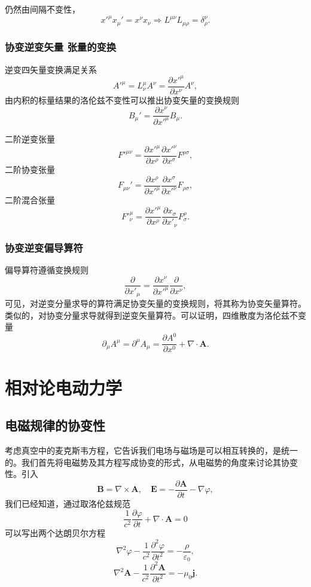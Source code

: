 \documentclass[UTF8]{ctexbook}
\renewcommand{\b}{\boldsymbol}
\numberwithin{equation}{chapter}
\begin{document}
	仍然由间隔不变性，
	\[x'^\mu x_\mu'=x^\nu x_\nu \Rightarrow L^{\mu\nu}L_{\mu \rho}=\delta_\rho^\nu.\]
	
	\subsection{协变\quad 逆变矢量 \quad 张量的变换}
	逆变四矢量变换满足关系
	\[A'^\mu=L_\nu^\mu A^\nu=\frac{\partial x'^\mu}{\partial x^\nu}A^\nu,\]
	由内积的标量结果的洛伦兹不变性可以推出协变矢量的变换规则
	\[B_\mu'=\frac{\partial x^\nu}{\partial x'^\mu}B_\mu.\]
	
	二阶逆变张量
	\[F'^{\mu\nu}=\frac{\partial x'^\mu}{\partial x^\rho}\frac{\partial x'^\nu}{\partial x^\sigma}F^{\rho\sigma},\]
	二阶协变张量
	\[F_{\mu\nu}'=\frac{\partial x^\rho}{\partial x'^\mu}\frac{\partial x^\sigma}{\partial x'^\nu}F_{\rho\sigma},\]
	二阶混合张量
	\[F'^\mu_\nu=\frac{\partial x'^\mu}{\partial x^\rho}\frac{\partial x_\sigma}{\partial x'_\nu}F^\rho_\sigma.\]
	
	
	\subsection{协变\quad 逆变偏导算符}
	
	偏导算符遵循变换规则
	\[\frac{\partial }{\partial x'_\mu}=\frac{\partial x^\nu}{\partial x'^\mu}\frac{\partial }{\partial x^\nu},\]
	可见，对逆变分量求导的算符满足协变矢量的变换规则，将其称为协变矢量算符。类似的，对协变分量求导就得到逆变矢量算符。可以证明，四维散度为洛伦兹不变量
	\[\partial_\mu A^\mu=\partial^\mu A_\mu=\frac{\partial A^0}{\partial x^0}+\nabla\cdot\b{A}.\]
		
	\chapter{相对论电动力学}
	
	\section{电磁规律的协变性}
	考虑真空中的麦克斯韦方程，它告诉我们电场与磁场是可以相互转换的，是统一的。我们首先将电磁势及其方程写成协变的形式，从电磁势的角度来讨论其协变性。引入
	\[\b{B}=\nabla\times\b{A},\quad \b{E}=-\frac{\partial \b{A}}{\partial t}-\nabla\varphi,\]
	我们已经知道，通过取洛伦兹规范
	\[\frac{1}{c^2}\frac{\partial \varphi}{\partial t}+\nabla\cdot\b{A}=0\]
	可以写出两个达朗贝尔方程
	\[\nabla^2 \varphi-\frac{1}{c^2}\frac{\partial^2\varphi}{\partial t^2}=-\frac{\rho}{\varepsilon_0},\]
	\[\nabla^2\b{A}-\frac{1}{c^2}\frac{\partial^2\b{A}}{\partial t^2}=-\mu_0\b{j}.\]
	
\end{document}

